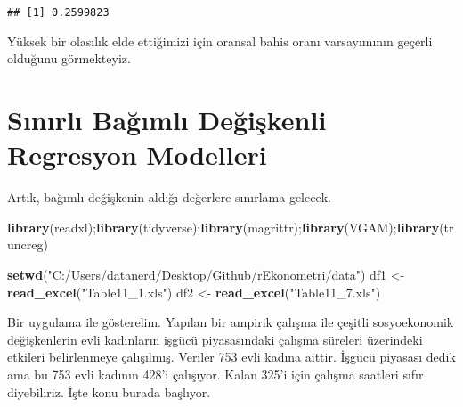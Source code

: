 \documentclass[
]{book}
\newenvironment{Shaded}{\begin{snugshade}}{\end{snugshade}}
\newcommand{\KeywordTok}[1]{\textcolor[rgb]{0.13,0.29,0.53}{\textbf{#1}}}
\newcommand{\NormalTok}[1]{#1}
\newcommand{\OperatorTok}[1]{\textcolor[rgb]{0.81,0.36,0.00}{\textbf{#1}}}
\newcommand{\StringTok}[1]{\textcolor[rgb]{0.31,0.60,0.02}{#1}}
\begin{document}
\begin{verbatim}
## [1] 0.2599823
\end{verbatim}

Yüksek bir olasılık elde ettiğimizi için oransal bahis oranı varsayımının geçerli olduğunu görmekteyiz.

\hypertarget{sux131nux131rlux131-baux11fux131mlux131-deux11fiux15fkenli-regresyon-modelleri}{%
\chapter{Sınırlı Bağımlı Değişkenli Regresyon Modelleri}\label{sux131nux131rlux131-baux11fux131mlux131-deux11fiux15fkenli-regresyon-modelleri}}

Artık, bağımlı değişkenin aldığı değerlere sınırlama gelecek.

\begin{Shaded}
\begin{Highlighting}[]
\KeywordTok{library}\NormalTok{(readxl);}\KeywordTok{library}\NormalTok{(tidyverse);}\KeywordTok{library}\NormalTok{(magrittr);}\KeywordTok{library}\NormalTok{(VGAM);}\KeywordTok{library}\NormalTok{(truncreg)}

\KeywordTok{setwd}\NormalTok{(}\StringTok{"C:/Users/datanerd/Desktop/Github/rEkonometri/data"}\NormalTok{)}
\NormalTok{df1 <-}\StringTok{ }\KeywordTok{read_excel}\NormalTok{(}\StringTok{"Table11_1.xls"}\NormalTok{)}
\NormalTok{df2 <-}\StringTok{ }\KeywordTok{read_excel}\NormalTok{(}\StringTok{"Table11_7.xls"}\NormalTok{)}
\end{Highlighting}
\end{Shaded}

Bir uygulama ile gösterelim. Yapılan bir ampirik çalışma ile çeşitli sosyoekonomik değişkenlerin evli kadınların işgücü piyasasındaki çalışma süreleri üzerindeki etkileri belirlenmeye çalışılmış. Veriler 753 evli kadına aittir. İşgücü piyasası dedik ama bu 753 evli kadının 428'i çalışıyor. Kalan 325'i için çalışma saatleri sıfır diyebiliriz. İşte konu burada başlıyor.

\begin{Shaded}
\end{Shaded}
\end{document}
